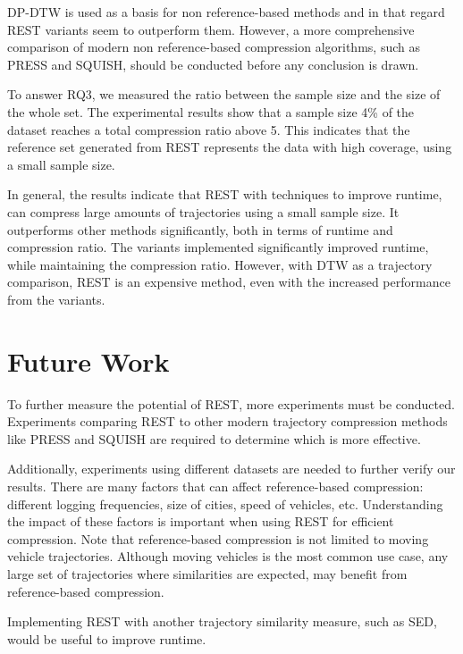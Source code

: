 DP-DTW is used as a basis for non reference-based methods and in that regard REST variants seem to outperform them. However, a more comprehensive comparison of modern non reference-based compression algorithms, such as PRESS and SQUISH, should be conducted before any conclusion is drawn.

To answer RQ3, we measured the ratio between the sample size and the size of the whole set. The experimental results show that a sample size 4\% of the dataset reaches a total compression ratio above 5. This indicates that the reference set generated from REST represents the data with high coverage, using a small sample size.

In general, the results indicate that REST with techniques to improve runtime, can compress large amounts of trajectories using a small sample size. It outperforms other methods significantly, both in terms of runtime and compression ratio. The variants implemented significantly improved runtime, while maintaining the compression ratio. However, with DTW as a trajectory comparison, REST is an expensive method, even with the increased performance from the variants.

\section{Future Work}
To further measure the potential of REST, more experiments must be conducted. Experiments comparing REST to other modern trajectory compression methods like PRESS and SQUISH are required to determine which is more effective.

Additionally, experiments using different datasets are needed to further verify our results. There are many factors that can affect reference-based compression: different logging frequencies, size of cities, speed of vehicles, etc. Understanding the impact of these factors is important when using REST for efficient compression. Note that reference-based compression is not limited to moving vehicle trajectories. Although moving vehicles is the most common use case, any large set of trajectories where similarities are expected, may benefit from reference-based compression.

Implementing REST with another trajectory similarity measure, such as SED, would be useful to improve runtime.
